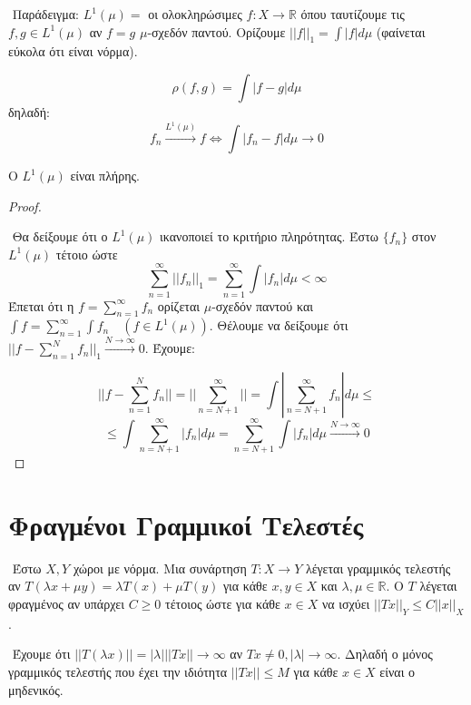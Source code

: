 $ $\newline
Παράδειγμα: $L^1(\mu) = $ οι ολοκληρώσιμες $f : X \rightarrow \mathbb R$ όπου ταυτίζουμε τις $f,g \in L^1(\mu)$ αν $f=g$ $\mu$-σχεδόν παντού. Ορίζουμε $||f||_1 = \int |f| d\mu$ (φαίνεται εύκολα ότι είναι νόρμα).

$$\rho (f,g) = \int |f-g|d\mu$$ δηλαδή:
$$f_n \overset{L^1(\mu)}{\longrightarrow } f \iff \int |f_n - f| d\mu \rightarrow 0$$

\begin{protash}
    Ο $L^1(\mu)$ είναι πλήρης.
\end{protash}

\begin{proof} $ $

    $ $\newline
    Θα δείξουμε ότι ο $L^1(\mu)$ ικανοποιεί το κριτήριο πληρότητας. Έστω $\{f_n\}$ στον $L^1(\mu)$ τέτοιο ώστε $$\sum\limits_{n=1}^{\infty} ||f_n||_1 = \sum\limits_{n=1}^{\infty} \int |f_n| d\mu < \infty$$ Έπεται ότι η $f = \sum\limits_{n=1}^{\infty} f_n$ ορίζεται $\mu$-σχεδόν παντού και $\int f = \sum\limits_{n=1}^{\infty} \int f_n \quad (f \in L^{1}(\mu))$. Θέλουμε να δείξουμε ότι $||f - \sum\limits_{n=1}^{N} f_n||_1 \overset{N \rightarrow \infty}{ \longrightarrow} 0$. Έχουμε:

    $$|| f - \sum\limits_{n=1}^N f_n|| = ||\sum\limits_{n = N+1}^{\infty} || = \int | \sum\limits_{n = N+1}^{\infty} f_n| d\mu \leq$$
    $$\leq \int \sum\limits_{n= N+1}^{\infty} |f_n| d\mu = \sum\limits_{n = N+1}^{\infty} \int |f_n| d\mu \overset{N \rightarrow \infty}{\longrightarrow} 0$$
\end{proof}

\pagebreak

\section{Φραγμένοι Γραμμικοί Τελεστές}

$ $\newline
Έστω $X,Y$ χώροι με νόρμα. Μια συνάρτηση $T: X \rightarrow Y$ λέγεται γραμμικός τελεστής αν $T(\lambda x + \mu y) = \lambda T(x) + \mu T(y)$ για κάθε $x,y \in X$ και $\lambda,\mu \in \mathbb R$. Ο $T$ λέγεται φραγμένος αν υπάρχει $C \geq 0$ τέτοιος ώστε για κάθε $x  \in X$ να ισχύει $||Tx||_Y \leq C ||x||_X$.

$ $\newline
Έχουμε ότι $||T(\lambda x) || = |\lambda| ||Tx|| \rightarrow \infty$ αν $Tx \neq 0, |\lambda|\rightarrow \infty$. Δηλαδή ο μόνος γραμμικός τελεστής που έχει την ιδιότητα $||Tx|| \leq M$ για κάθε $x \in X$ είναι ο μηδενικός.


